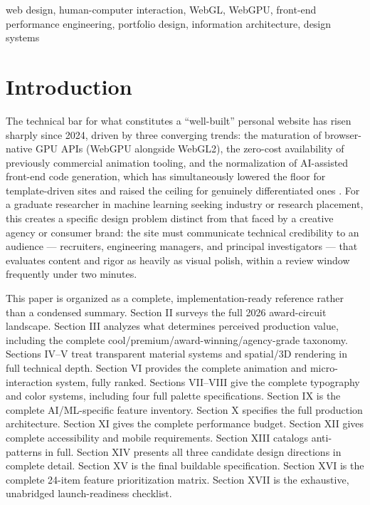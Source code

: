 \documentclass[conference]{IEEEtran}
\begin{document}
\begin{IEEEkeywords}
web design, human-computer interaction, WebGL, WebGPU, front-end performance engineering, portfolio design, information architecture, design systems
\end{IEEEkeywords}

\section{Introduction}

The technical bar for what constitutes a ``well-built'' personal website has risen sharply since 2024, driven by three converging trends: the maturation of browser-native GPU APIs (WebGPU alongside WebGL2), the zero-cost availability of previously commercial animation tooling, and the normalization of AI-assisted front-end code generation, which has simultaneously lowered the floor for template-driven sites and raised the ceiling for genuinely differentiated ones \cite{talent500_2026}. For a graduate researcher in machine learning seeking industry or research placement, this creates a specific design problem distinct from that faced by a creative agency or consumer brand: the site must communicate technical credibility to an audience --- recruiters, engineering managers, and principal investigators --- that evaluates content and rigor as heavily as visual polish, within a review window frequently under two minutes.

This paper is organized as a complete, implementation-ready reference rather than a condensed summary. Section II surveys the full 2026 award-circuit landscape. Section III analyzes what determines perceived production value, including the complete cool/premium/award-winning/agency-grade taxonomy. Sections IV--V treat transparent material systems and spatial/3D rendering in full technical depth. Section VI provides the complete animation and micro-interaction system, fully ranked. Sections VII--VIII give the complete typography and color systems, including four full palette specifications. Section IX is the complete AI/ML-specific feature inventory. Section X specifies the full production architecture. Section XI gives the complete performance budget. Section XII gives complete accessibility and mobile requirements. Section XIII catalogs anti-patterns in full. Section XIV presents all three candidate design directions in complete detail. Section XV is the final buildable specification. Section XVI is the complete 24-item feature prioritization matrix. Section XVII is the exhaustive, unabridged launch-readiness checklist.
\end{document}

